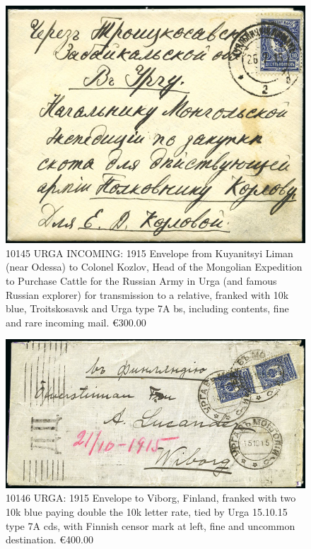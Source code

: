 \begin{figure}[htbp]
\centering
\includegraphics[width=.95\textwidth]{../russian-post-in-mongolia/10145.jpg}
\caption{ 
10145 URGA INCOMING: 1915 Envelope from Kuyanitsyi Liman (near Odessa) 
to Colonel Kozlov, Head of the Mongolian Expedition to Purchase Cattle 
for the Russian Army in Urga (and famous Russian explorer) for transmission
to a relative, franked with 10k blue, Troitskosavsk and Urga type 7A bs,
including contents, fine and rare incoming mail.
\euro 300.00 
} 
\end{figure}  

\begin{figure}[htbp]
\centering
\includegraphics[width=.95\textwidth]{../russian-post-in-mongolia/10146.jpg}
\caption{ 
10146	URGA: 1915 Envelope to Viborg, Finland, franked with two 10k
blue paying double the 10k letter rate, tied by Urga 15.10.15 type 7A cds,
with Finnish censor mark at left, fine and uncommon destination.
\euro400.00 
} 
\end{figure}  

